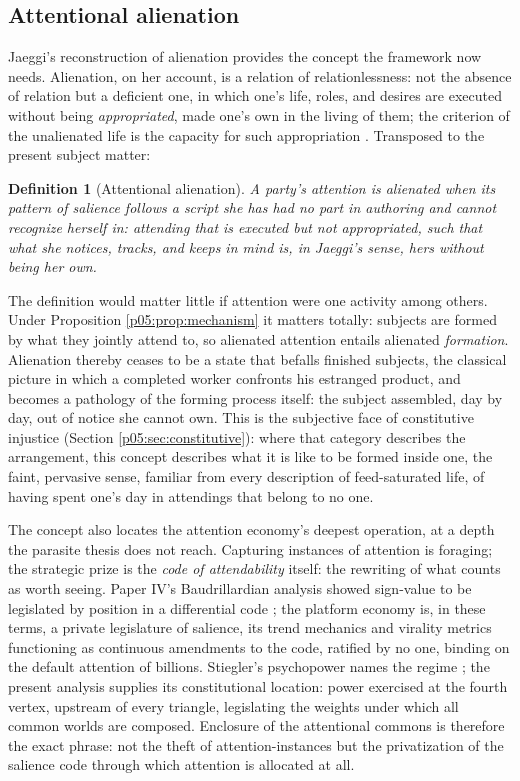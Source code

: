 \documentclass[11pt,a4paper]{article}
\theoremstyle{seriesthm}
\newtheorem{defn}{Definition}
\begin{document}
\subsection{Attentional alienation}
\label{p05:sec:alienation}

Jaeggi's reconstruction of alienation provides the concept the framework now needs. Alienation, on her account, is a relation of relationlessness: not the absence of relation but a deficient one, in which one's life, roles, and desires are executed without being \emph{appropriated}, made one's own in the living of them; the criterion of the unalienated life is the capacity for such appropriation \parencite{jaeggi2014}. Transposed to the present subject matter:

\begin{defn}[Attentional alienation]\label{p05:def:alienation}
A party's attention is alienated when its pattern of salience follows a script she has had no part in authoring and cannot recognize herself in: attending that is executed but not appropriated, such that what she notices, tracks, and keeps in mind is, in Jaeggi's sense, hers without being her own.
\end{defn}

The definition would matter little if attention were one activity among others. Under Proposition \ref{p05:prop:mechanism} it matters totally: subjects are formed by what they jointly attend to, so alienated attention entails alienated \emph{formation}. Alienation thereby ceases to be a state that befalls finished subjects, the classical picture in which a completed worker confronts his estranged product, and becomes a pathology of the forming process itself: the subject assembled, day by day, out of notice she cannot own. This is the subjective face of constitutive injustice (Section \ref{p05:sec:constitutive}): where that category describes the arrangement, this concept describes what it is like to be formed inside one, the faint, pervasive sense, familiar from every description of feed-saturated life, of having spent one's day in attendings that belong to no one.

The concept also locates the attention economy's deepest operation, at a depth the parasite thesis does not reach. Capturing instances of attention is foraging; the strategic prize is the \emph{code of attendability} itself: the rewriting of what counts as worth seeing. Paper IV's Baudrillardian analysis showed sign-value to be legislated by position in a differential code \parencite{baudrillard1981}; the platform economy is, in these terms, a private legislature of salience, its trend mechanics and virality metrics functioning as continuous amendments to the code, ratified by no one, binding on the default attention of billions. Stiegler's psychopower names the regime \parencite{stiegler2010}; the present analysis supplies its constitutional location: power exercised at the fourth vertex, upstream of every triangle, legislating the weights under which all common worlds are composed. Enclosure of the attentional commons is therefore the exact phrase: not the theft of attention-instances but the privatization of the salience code through which attention is allocated at all.
\end{document}
